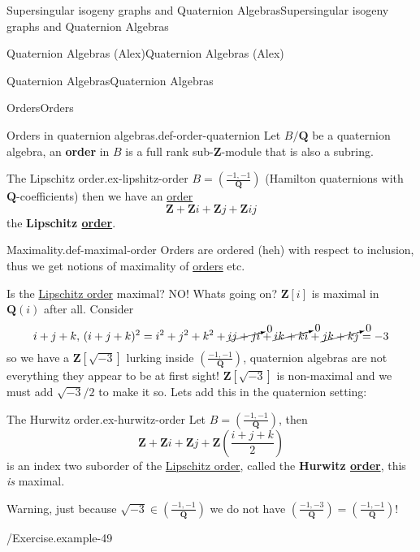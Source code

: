 \documentclass[10pt,]{book}
\newcommand{\terminology}[1]{\textbf{#1}}
\numberwithin{equation}{section}
\newcommand{\legendre}[2]{\left(\frac{#1}{#2}\right)}
\newcommand{\lb}{[}
\newcommand{\rb}{]}
\newcommand{\ZZ}{\mathbf{Z}}
\newcommand{\QQ}{\mathbf{Q}}
\begin{document}
\begin{chapterptx}{Supersingular isogeny graphs and Quaternion Algebras}{}{Supersingular isogeny graphs and Quaternion Algebras}{}{}
\begin{sectionptx}{Quaternion Algebras (Alex)}{}{Quaternion Algebras (Alex)}{}{}
\begin{subsectionptx}{Quaternion Algebras}{}{Quaternion Algebras}{}{}
\begin{subsubsectionptx}{Orders}{}{Orders}{}{}
\begin{definition}{Orders in quaternion algebras.}{def-order-quaternion}%
\hypertarget{p-905}{}%
Let \(B/\QQ\) be a quaternion algebra, an \terminology{order} in \(B\) is a full rank sub-\(\ZZ\)-module that is also a subring.%
\end{definition}
\begin{example}{The Lipschitz order.}{ex-lipshitz-order}%
\hypertarget{p-906}{}%
\(B = \legendre{-1,-1}{\QQ}\) (Hamilton quaternions with \(\QQ\)-coefficients) then we have an \hyperref[def-order-quaternion]{order}%
\begin{equation*}
\ZZ + \ZZ i + \ZZ j + \ZZ ij
\end{equation*}
the \terminology{Lipschitz \hyperref[def-order-quaternion]{order}}.%
\end{example}
\begin{definition}{Maximality.}{def-maximal-order}%
\hypertarget{p-907}{}%
Orders are ordered (heh) with respect to inclusion, thus we get notions of maximality of \hyperref[def-order-quaternion]{orders} etc.%
\end{definition}
\hypertarget{p-908}{}%
Is the \hyperref[ex-lipshitz-order]{Lipschitz order} maximal? NO! Whats going on? \(\ZZ\lb i\rb\) is maximal in \(\QQ(i)\) after all. Consider%
\begin{equation*}
i + j + k,\,(i+j + k)^2 = i^2 + j^2 + k^2 + \cancelto{0}{ij + ji} + \cancelto{0}{ik + ki} + \cancelto{0}{jk + kj} = -3
\end{equation*}
so we have a \(\ZZ\lb \sqrt{-3}\rb\) lurking inside \(\legendre{-1,-1}{\QQ}\), quaternion algebras are not everything they appear to be at first sight! \(\ZZ\lb \sqrt{-3}\rb\) is non-maximal and we must add \(\sqrt{-3}/2\) to make it so. Lets add this in the quaternion setting:%
\begin{example}{The Hurwitz order.}{ex-hurwitz-order}%
\hypertarget{p-909}{}%
Let \(B = \legendre{-1,-1}{\QQ}\), then%
\begin{equation*}
\ZZ+  \ZZ i + \ZZ j + \ZZ \left(\frac{i + j + k}{2}\right)
\end{equation*}
is an index two suborder of the \hyperref[ex-lipshitz-order]{Lipschitz order}, called the \terminology{Hurwitz \hyperref[def-order-quaternion]{order}}, this \emph{is} maximal.%
\end{example}
\hypertarget{p-910}{}%
Warning, just because \(\sqrt{-3} \in \legendre{-1,-1}{\QQ}\) we do not have \(\legendre{-1,-3}{\QQ} = \legendre{-1,-1}{\QQ}\)!%
\begin{example}{/Exercise.}{example-49}%

\end{example}
\end{subsubsectionptx}
\end{subsectionptx}
\end{sectionptx}
\end{chapterptx}
\end{document}
